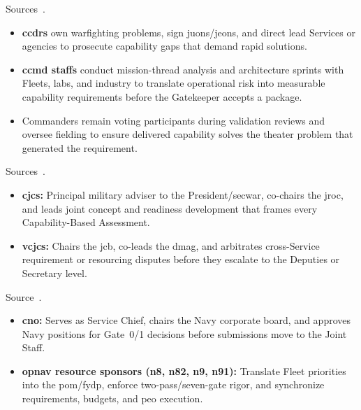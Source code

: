 \documentclass[../main.tex]{subfiles}
\begin{document}
\begin{description}[style=nextline, labelsep=0.5em, font=\bfseries]
  \item[\textbf{Combatant command sponsors.}]
        Sources~\autocite{edo-2-1-1-command-structures-2025,jcids-manual-2021}.
        \begin{itemize}
          \item \textbf{\ac{ccdr}s} own warfighting problems, sign \acp{juon}/\acp{jeon}, and direct lead Services or agencies to prosecute capability gaps that demand rapid solutions.
          \item \textbf{\ac{ccmd} staffs} conduct mission-thread analysis and architecture sprints with Fleets, labs, and industry to translate operational risk into measurable capability requirements before the Gatekeeper accepts a package.
          \item Commanders remain voting participants during validation reviews and oversee fielding to ensure delivered capability solves the theater problem that generated the requirement.
        \end{itemize}

  \item[\textbf{Joint Chiefs leadership.}]
        Sources~\autocite{edo-2-1-1-command-structures-2025,jcids-manual-2021,USC-10-181}.
        \begin{itemize}
          \item \textbf{\ac{cjcs}:} Principal military adviser to the President/\ac{secwar}, co-chairs the \ac{jroc}, and leads joint concept and readiness development that frames every Capability-Based Assessment.
          \item \textbf{\ac{vcjcs}:} Chairs the \ac{jcb}, co-leads the \ac{dmag}, and arbitrates cross-Service requirement or resourcing disputes before they escalate to the Deputies or Secretary level.
        \end{itemize}

  \item[\textbf{\ac{opnav} corporate leadership.}]
        Source~\autocite{edo-2-1-1-command-structures-2025}.
        \begin{itemize}
          \item \textbf{\ac{cno}:} Serves as Service Chief, chairs the Navy corporate board, and approves Navy positions for Gate~0/1 decisions before submissions move to the Joint Staff.
          \item \textbf{\ac{opnav} resource sponsors (\ac{n8}, \ac{n82}, \ac{n9}, \ac{n91}):} Translate Fleet priorities into the \ac{pom}/\ac{fydp}, enforce two-pass/seven-gate rigor, and synchronize requirements, budgets, and \ac{peo} execution.
        \end{itemize}


\end{description}
\end{document}
